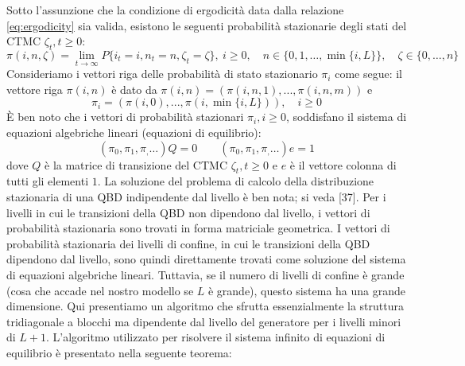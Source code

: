 \documentclass[11pt]{article}
\begin{document}
Sotto l'assunzione che la condizione di ergodicità data dalla relazione \ref{eq:ergodicity} sia valida, esistono le seguenti probabilità stazionarie degli stati del CTMC $\zeta_t, t \geq 0$:
\begin{equation}
    \pi(i,n,\zeta) = \lim_{t \to \infty} P\{i_t = i, n_t = n, \zeta_t = \zeta\}, ~ i \geq 0, \quad n \in \{0, 1, \dots , \min\{i,L\}\}, \quad \zeta \in \{0, \dots, n\}
\end{equation}
Consideriamo i vettori riga delle probabilità di stato stazionario $\pi_i$ come segue: il vettore riga $\pi(i,n)$ è dato da $\pi(i,n) = (\pi(i,n,1), ..., \pi(i,n,m))$ e
\begin{equation}
    \pi_i = (\pi(i,0), ..., \pi(i, \min \{i,L\})), \quad i \geq 0
\end{equation}
È ben noto che i vettori di probabilità stazionari $\pi_i, i \geq 0$, soddisfano il sistema di equazioni algebriche lineari (equazioni di equilibrio):
\begin{equation}
    (\pi_0, \pi_1, \pi_, \dots)Q = 0 \qquad (\pi_0, \pi_1, \pi_, \dots)e = 1
\end{equation}
dove $Q$ è la matrice di transizione del CTMC $\zeta_t, t \geq 0$ e $e$ è il vettore colonna di tutti gli elementi $1$. La soluzione del problema di calcolo della distribuzione stazionaria di una QBD indipendente dal livello è ben nota; si veda [37]. Per i livelli in cui le transizioni della QBD non dipendono dal livello, i vettori di probabilità stazionaria sono trovati in forma matriciale geometrica. I vettori di probabilità stazionaria dei livelli di confine, in cui le transizioni della QBD dipendono dal livello, sono quindi direttamente trovati come soluzione del sistema di equazioni algebriche lineari. Tuttavia, se il numero di livelli di confine è grande (cosa che accade nel nostro modello se $L$ è grande), questo sistema ha una grande dimensione. Qui presentiamo un algoritmo che sfrutta essenzialmente la struttura tridiagonale a blocchi ma dipendente dal livello del generatore per i livelli minori di $L + 1$. L'algoritmo utilizzato per risolvere il sistema infinito di equazioni di equilibrio è presentato nella seguente teorema:
\end{document}

